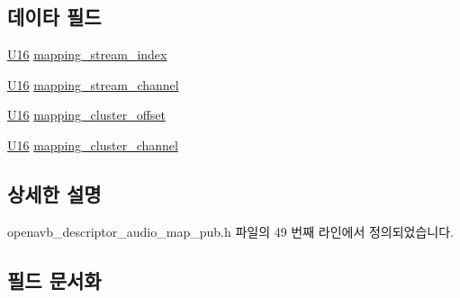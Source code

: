 \subsection*{데이타 필드}
\begin{DoxyCompactItemize}
\item 
\hyperlink{openavb__types__base__pub_8h_a0a0a322d5fa4a546d293a77ba8b4a71f}{U16} \hyperlink{structopenavb__aem__descriptor__audio__map__audio__mapping__format__t_aab5314b6aa5b4cad7c10713df06c06ff}{mapping\+\_\+stream\+\_\+index}
\item 
\hyperlink{openavb__types__base__pub_8h_a0a0a322d5fa4a546d293a77ba8b4a71f}{U16} \hyperlink{structopenavb__aem__descriptor__audio__map__audio__mapping__format__t_aab20a76c640b393efd2df577dc9859aa}{mapping\+\_\+stream\+\_\+channel}
\item 
\hyperlink{openavb__types__base__pub_8h_a0a0a322d5fa4a546d293a77ba8b4a71f}{U16} \hyperlink{structopenavb__aem__descriptor__audio__map__audio__mapping__format__t_a1ff248c0bee369341f32f24e4205c9fa}{mapping\+\_\+cluster\+\_\+offset}
\item 
\hyperlink{openavb__types__base__pub_8h_a0a0a322d5fa4a546d293a77ba8b4a71f}{U16} \hyperlink{structopenavb__aem__descriptor__audio__map__audio__mapping__format__t_acbfe185c8e2333ea9013cdce207d6e67}{mapping\+\_\+cluster\+\_\+channel}
\end{DoxyCompactItemize}


\subsection{상세한 설명}


openavb\+\_\+descriptor\+\_\+audio\+\_\+map\+\_\+pub.\+h 파일의 49 번째 라인에서 정의되었습니다.



\subsection{필드 문서화}
